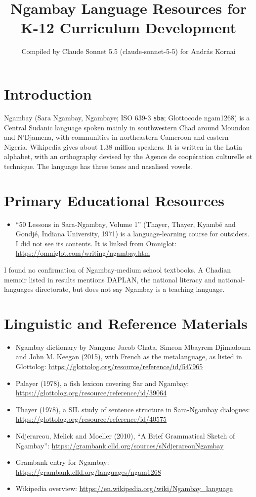 \documentclass[12pt]{article}
\title{Ngambay Language Resources for K-12 Curriculum Development}
\author{Compiled by Claude Sonnet 5.5 (claude-sonnet-5-5) for Andr\'as Kornai}
\date{}
\begin{document}
\maketitle

\section{Introduction}
Ngambay (Sara Ngambay, Ngambaye; ISO 639-3 \texttt{sba}; Glottocode ngam1268) is a Central Sudanic language spoken mainly in southwestern Chad around Moundou and N'Djamena, with communities in northeastern Cameroon and eastern Nigeria. Wikipedia gives about 1.38 million speakers. It is written in the Latin alphabet, with an orthography devised by the Agence de coop\'eration culturelle et technique. The language has three tones and nasalised vowels.

\section{Primary Educational Resources}
\begin{itemize}
\item ``50 Lessons in Sara-Ngambay, Volume 1'' (Thayer, Thayer, Kyamb\'e and Gondj\'e, Indiana University, 1971) is a language-learning course for outsiders. I did not see its contents. It is linked from Omniglot: \url{https://omniglot.com/writing/ngambay.htm}
\end{itemize}
I found no confirmation of Ngambay-medium school textbooks. A Chadian memoir listed in results mentions DAPLAN, the national literacy and national-languages directorate, but does not say Ngambay is a teaching language.

\section{Linguistic and Reference Materials}
\begin{itemize}
\item Ngambay dictionary by Nangone Jacob Chata, Simeon Mbayrem Djimadoum and John M. Keegan (2015), with French as the metalanguage, as listed in Glottolog: \url{https://glottolog.org/resource/reference/id/547965}
\item Palayer (1978), a fish lexicon covering Sar and Ngambay: \url{https://glottolog.org/resource/reference/id/39064}
\item Thayer (1978), a SIL study of sentence structure in Sara-Ngambay dialogues: \url{https://glottolog.org/resource/reference/id/40575}
\item Ndjerareou, Melick and Moeller (2010), ``A Brief Grammatical Sketch of Ngambay'': \url{https://grambank.clld.org/sources/sNdjerareouNgambay}
\item Grambank entry for Ngambay: \url{https://grambank.clld.org/languages/ngam1268}
\item Wikipedia overview: \url{https://en.wikipedia.org/wiki/Ngambay_language}
\end{itemize}
\end{document}
